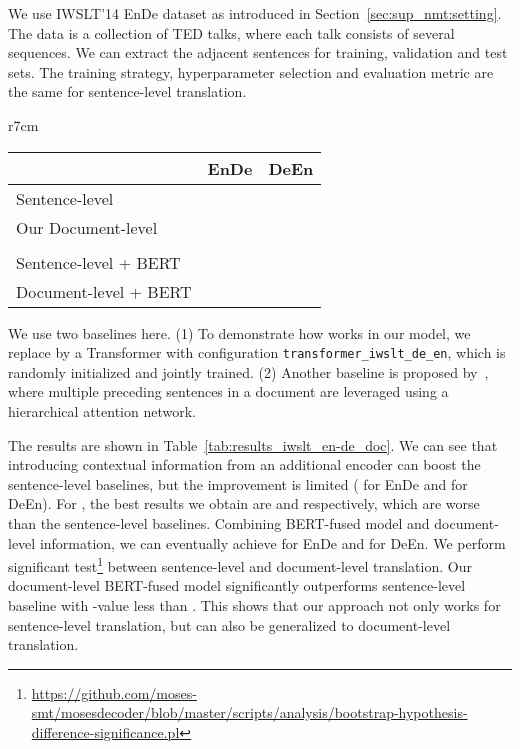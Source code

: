\documentclass{article} \usepackage{iclr2020_conference,times}
\begin{document}
 We use IWSLT'14 EnDe dataset as introduced in Section~\ref{sec:sup_nmt:setting}. The data is a collection of TED talks, where each talk consists of several sequences. We can extract the adjacent sentences for training, validation and test sets. The training strategy, hyperparameter selection and evaluation metric are the same for sentence-level translation. 

\begin{wraptable}{r}{7cm}
\vspace{-0.8cm}
\small
\centering
\caption{BLEU  of  document-level translation.}
\begin{tabular}{lcc}
\toprule
& EnDe & DeEn \\
\midrule
Sentence-level &  &  \\
\midrule
Our Document-level && \\
\citet{miculicich2018document}&& \\
\midrule
Sentence-level + BERT &  &  \\
Document-level + BERT &  &  \\
\bottomrule
\end{tabular}
\label{tab:results_iwslt_en-de_doc}
\vspace{-0.5cm}
\end{wraptable}

 We use two baselines here. (1) To demonstrate how  works in our model, we replace  by a Transformer with configuration \texttt{transformer\_iwslt\_de\_en}, which is randomly initialized and jointly trained. (2) Another baseline is proposed by~\cite{miculicich2018document}, where multiple preceding sentences in a document are leveraged using a hierarchical attention network.



 The results are shown in Table~\ref{tab:results_iwslt_en-de_doc}. We can see that introducing contextual information from an additional encoder can boost the sentence-level baselines, but the improvement is limited ( for EnDe and  for DeEn). For \citet{miculicich2018document}, the best results we obtain are  and  respectively, which are worse than the sentence-level baselines. Combining BERT-fused model and document-level information, we can eventually achieve  for EnDe and  for DeEn. 
We perform significant test\footnote{\url{https://github.com/moses-smt/mosesdecoder/blob/master/scripts/analysis/bootstrap-hypothesis-difference-significance.pl}} between sentence-level and document-level translation. Our document-level BERT-fused model significantly outperforms sentence-level baseline with -value less than . This shows that our approach not only works for sentence-level translation, but can also be generalized to document-level translation. 
\end{document}
